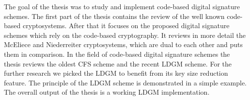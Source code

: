 The goal of the thesis was to study and implement code-based digital 
signature schemes. The first part of the thesis contains the review of 
the well known code-based cryptosystems. After that it focuses on the proposed 
digital signature schemes which rely on the code-based cryptography. It reviews 
in more detail the McEliece and Niederreiter cryptosystems, which are dual to 
each other and puts them in comparison. In the field of code-based digital signature 
schemes the thesis reviews the oldest CFS scheme and the recent LDGM scheme. 
For the further research we picked the LDGM to benefit from its key size reduction 
feature. The principle of the LDGM scheme is demonstrated in a simple example.
The overall output of the thesis is a working LDGM implementation. 